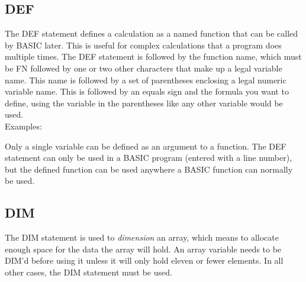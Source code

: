 \subsection{DEF}

The {\ttfamily DEF} statement defines a calculation as a named function that
can be called by BASIC later.  This is useful for complex calculations that a
program does multiple times.  The {\ttfamily DEF} statement is followed by the
function name, which must be {\ttfamily FN} followed by one or two other
characters that make up a legal variable name.  This name is followed by a set
of parentheses enclosing a legal numeric variable name.  This is followed by an
equals sign and the formula you want to define, using the variable in the
parentheses like any other variable would be used.\\

Examples:\\


Only a single variable can be defined as an argument to a function.  The
{\ttfamily DEF} statement can only be used in a BASIC program (entered with a
line number), but the defined function can be used anywhere a BASIC function
can normally be used.\\


\subsection{DIM}

The {\ttfamily DIM} statement is used to \emph{dimension} an array, which means
to allocate enough space for the data the array will hold.  An array variable
needs to be {\ttfamily DIM}'d before using it unless it will only hold eleven
or fewer elements.  In all other cases, the {\ttfamily DIM} statement must be
used.\\


